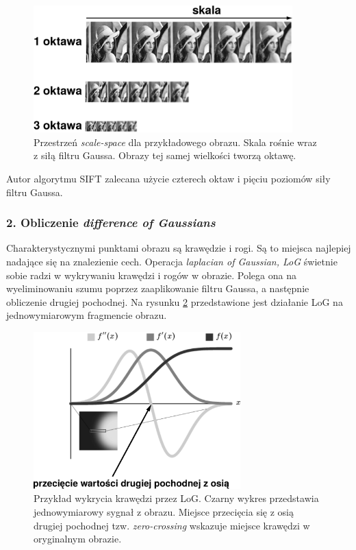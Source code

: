 \begin{figure}[H]
  \centering
  \includegraphics[width=10cm]{gfx/scale_space}
  \caption{Przestrzeń \textit{scale-space} dla przykładowego obrazu. Skala rośnie wraz z siłą filtru Gaussa. Obrazy tej samej wielkości tworzą oktawę.}
  \label{fig:proponowane_algorytmy:scale_space_fig}
\end{figure}

Autor algorytmu SIFT zalecana użycie czterech oktaw i pięciu poziomów siły filtru Gaussa.

\subsubsection{2. Obliczenie \textit{difference of Gaussians}}
\label{sec:proponowane_algorytmy:difference}

Charakterystycznymi punktami obrazu są krawędzie i rogi. Są to miejsca najlepiej nadające się na znalezienie cech. Operacja \textit{laplacian of Gaussian, LoG} świetnie sobie radzi w wykrywaniu krawędzi i rogów w obrazie. Polega ona na wyeliminowaniu szumu poprzez zaaplikowanie filtru Gaussa, a następnie obliczenie drugiej pochodnej. Na rysunku \ref{fig:proponowane_algorytmy:gauss} przedstawione jest działanie LoG na jednowymiarowym fragmencie obrazu.

\begin{figure}[H]
  \centering
  \includegraphics[width=8cm]{gfx/gauss}
  \caption{Przykład wykrycia krawędzi przez LoG. Czarny wykres przedstawia jednowymiarowy sygnał z obrazu. Miejsce przecięcia się z osią drugiej pochodnej tzw. \textit{zero-crossing} wskazuje miejsce krawędzi w oryginalnym obrazie.}
  \label{fig:proponowane_algorytmy:gauss}
\end{figure}

